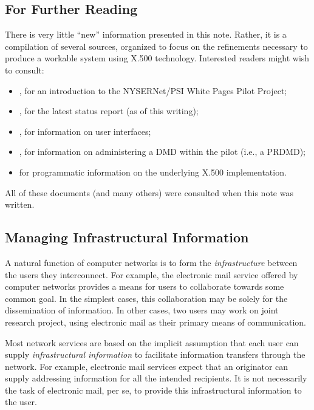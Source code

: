 \newpage
\subsection	{For Further Reading}
There is very little ``new'' information presented in this note.
Rather,
it is a compilation of several sources,
organized to focus on the refinements necessary to produce a workable system
using X.500 technology.
Interested readers might wish to consult:
\begin{itemize}
\item	\cite{WPP.Intro},
	for an introduction to the NYSERNet/PSI White Pages Pilot Project;

\item	\cite{WPP.Report-1},
	for the latest status report (as of this writing);

\item	\cite{WPP.User,WPP.XWP},
	for information on user interfaces;

\item	\cite{WPP.Admin},
	for information on administering a DMD within the pilot
	(i.e., a PRDMD);

\item	\cite{QUIPU.Manual}
	for programmatic information on the underlying X.500 implementation.
\end{itemize}
All of these documents (and many others) were consulted when this note was
written.

\newpage
\subsection	{Managing Infrastructural Information}
A natural function of computer networks is to form the {\em infrastructure\/}
between the users they interconnect.
For example,
the electronic mail service offered by computer networks provides a means for
users to collaborate towards some common goal.
In the simplest cases,
this collaboration may be solely for the dissemination of information.
In other cases,
two users may work on joint research project,
using electronic mail as their primary means of communication.

Most network services are based on the implicit assumption that each user can
supply {\em infrastructural information} to 
facilitate information transfers through the network.
For example,
electronic mail services expect that an originator can supply 
addressing information 
for all the intended recipients.
It is not necessarily the task of electronic mail, per se,
to provide this infrastructural information to the user.

